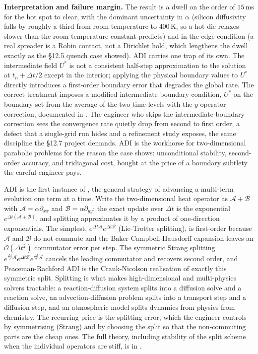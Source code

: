 \textbf{Interpretation and failure margin.} The result is a dwell on
the order of $15\,\si{\milli\second}$ for the hot spot to clear, with
the dominant uncertainty in $\alpha$ (silicon diffusivity falls by
roughly a third from room temperature to $400\,\si{\kelvin}$, so a
hot die relaxes slower than the room-temperature constant predicts)
and in the edge condition (a real spreader is a Robin contact, not a
Dirichlet hold, which lengthens the dwell exactly as the §12.5 quench
case showed). ADI carries one trap of its own. The intermediate
field $U^{*}$ is not a consistent half-step approximation to the
solution at $t_{n} + \Delta t/2$ except in the interior; applying the
physical boundary values to $U^{*}$ directly introduces a first-order
boundary error that degrades the global rate. The correct treatment
imposes a modified intermediate boundary condition, $U^{*}$ on the
boundary set from the average of the two time levels with the
$y$-operator correction, documented in
\textcite{text:v2ch12-morton-mayers}. The engineer who skips the
intermediate-boundary correction sees the convergence rate quietly
drop from second to first order, a defect that a single-grid run
hides and a refinement study exposes, the same discipline the §12.7
project demands. ADI is the workhorse for two-dimensional parabolic
problems for the reason the case shows: unconditional stability,
second-order accuracy, and tridiagonal cost, bought at the price of
a boundary subtlety the careful engineer pays.

\begin{mastery}
ADI is the first instance of , the
general strategy of advancing a multi-term evolution one term at a
time. Write the two-dimensional heat operator as $\mathcal{A} +
\mathcal{B}$ with $\mathcal{A} = \alpha\partial_{xx}$ and
$\mathcal{B} = \alpha\partial_{yy}$; the exact update over $\Delta t$
is the exponential $e^{\Delta t(\mathcal{A} + \mathcal{B})}$, and
splitting approximates it by a product of one-direction exponentials.
The simplest, $e^{\Delta t\mathcal{A}}e^{\Delta t\mathcal{B}}$
(Lie-Trotter splitting), is first-order because $\mathcal{A}$ and
$\mathcal{B}$ do not commute and the Baker-Campbell-Hausdorff
expansion leaves an $\mathcal{O}(\Delta t^{2})$ commutator error per
step. The symmetric Strang splitting
$e^{\frac{\Delta t}{2}\mathcal{A}}e^{\Delta t\mathcal{B}}
e^{\frac{\Delta t}{2}\mathcal{A}}$ cancels the leading commutator and
recovers second order, and Peaceman-Rachford ADI is the Crank-Nicolson
realisation of exactly this symmetric split. Splitting is what makes
high-dimensional and multi-physics solvers tractable: a
reaction-diffusion system splits into a diffusion solve and a
reaction solve, an advection-diffusion problem splits into a transport
step and a diffusion step, and an atmospheric model splits dynamics
from physics from chemistry. The recurring price is the splitting
error, which the engineer controls by symmetrising (Strang) and by
choosing the split so that the non-commuting parts are the cheap ones.
The full theory, including stability of the split scheme when the
individual operators are stiff, is in \textcite{text:v2ch12-leveque-fdm}.
\end{mastery}

